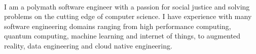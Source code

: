 
 \

\begin{cvparagraph}

{I am a polymath software engineer with a passion for social justice and solving problems on the cutting edge of computer science. I have experience with many software engineering domains ranging from high performance computing, quantum computing, machine learning and internet of things, to augmented reality, data engineering and cloud native engineering.}

\end{cvparagraph}
